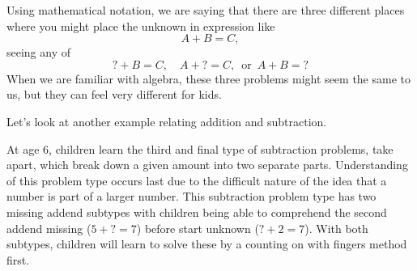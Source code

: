 \documentclass{ximera}
\begin{document}
Using mathematical notation, we are saying that there are three different places where you might place the unknown in expression like
\[
A + B = C, 
\]
seeing any of 
\[
? + B = C, \quad A + ? = C, \, \textrm{ or } \, A + B = ?
\]
When we are familiar with algebra, these three problems might seem the same to us, but they can feel very different for kids.

Let's look at another example relating addition and subtraction.

At age 6, children learn the third and final type of subtraction problems, take apart, which break down a given amount into two separate parts.  Understanding of this problem type occurs last due to the difficult nature of the idea that a number is part of a larger number. This subtraction problem type has two missing addend subtypes with children being able to comprehend the second addend missing ($5+?=7$) before start unknown ($?+2=7$). With both subtypes, children will learn to solve these by a counting on with fingers method first. 
\end{document}

